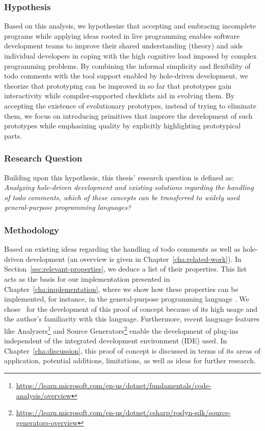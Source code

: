 \subsubsection{Hypothesis}
Based on this analysis, we hypothesize that accepting and embracing incomplete programs while applying ideas rooted in live programming enables software development teams to improve their shared understanding (theory) and aids individual developers in coping with the high cognitive load imposed by complex programming problems.
By combining the informal simplicity and flexibility of todo comments with the tool support enabled by hole-driven development, we theorize that prototyping can be improved in so far that prototypes gain interactivity while compiler-supported checklists aid in evolving them.
By accepting the existence of evolutionary prototypes, instead of trying to eliminate them, we focus on introducing primitives that improve the development of such prototypes while emphasizing quality by explicitly highlighting prototypical parts.

\subsubsection{Research Question}
Building upon this hypothesis, this thesis' research question is defined as: \emph{Analyzing hole-driven development and existing solutions regarding the handling of todo comments, which of these concepts can be transferred to widely used general-purpose programming languages?}

\subsubsection{Methodology}
Based on existing ideas regarding the handling of todo comments as well as hole-driven development (an overview is given in Chapter~\ref{cha:related-work}).
In Section~\ref{sec:relevant-properties}, we deduce a list of their properties.
This list acts as the basis for our implementation presented in Chapter~\ref{cha:implementation}, where we show how these properties can be implemented, for instance, in the general-purpose programming language \CS.
We chose \CS\ for the development of this proof of concept because of its high usage \cite{stack_overflow_stack_2023, tiobe_software_bv_tiobe_2023} and the author's familiarity with this language.
Furthermore, recent language features like Analyzers\footnote{\url{https://learn.microsoft.com/en-us/dotnet/fundamentals/code-analysis/overview}} and Source Generators\footnote{\url{https://learn.microsoft.com/en-us/dotnet/csharp/roslyn-sdk/source-generators-overview}} enable the development of plug-ins independent of the integrated development environment (IDE) used.
In Chapter~\ref{cha:discussion}, this proof of concept is discussed in terms of its areas of application, potential additions, limitations, as well as ideas for further research.
